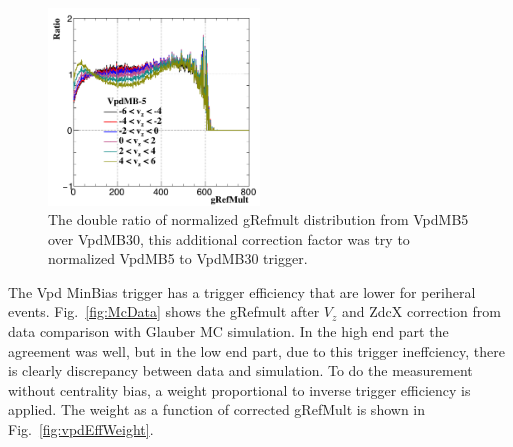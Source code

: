 \begin{figure}[htbp]
\centering
\includegraphics[keepaspectratio,width=0.5\textwidth]{figure/Run14_D0HFT/MB5_VzScale.png}
\caption{The double ratio of normalized gRefmult distribution from VpdMB5 over VpdMB30, this additional correction factor was try to normalized VpdMB5 to VpdMB30 trigger.}
 \label{fig:MB5_vzscale}
\end{figure}

The Vpd MinBias trigger has a trigger efficiency that are lower for periheral events. Fig.~\ref{fig:McData} shows the gRefmult after $V_{z}$ and ZdcX correction from data comparison with Glauber MC simulation. In the high end part the agreement was well, but in the low end part, due to this trigger ineffciency, there is clearly discrepancy between data and simulation. To do the measurement without centrality bias, a weight proportional to inverse trigger efficiency is applied. The weight as a function of corrected gRefMult is shown in Fig.~\ref{fig:vpdEffWeight}.

